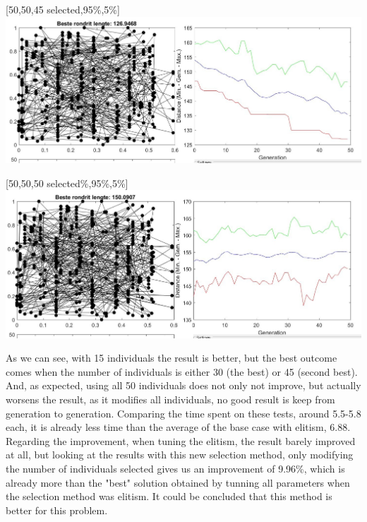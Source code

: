 \begin{center}
[50,50,45 selected,95\%,5\%]\\
\includegraphics[width=15cm]{img/optional/optional_4.jpg}
\end{center}

\begin{center}
[50,50,50 selected\%,95\%,5\%]\\
\includegraphics[width=15cm]{img/optional/optional_5.jpg}
\end{center}

As we can see, with 15 individuals the result is better, but the best outcome
comes when the number of individuals is either 30 (the best) or 45 (second
best). And, as expected, using all 50 individuals does not only not improve,
but actually worsens the result, as it modifies all individuals, no good
result is keep from generation to generation. Comparing the time spent on these
tests, around 5.5-5.8 each, it is already less time than the average of the base
case with elitism, 6.88. 
Regarding the improvement, when tuning the elitism, the result barely improved
at all, but looking at the results with this new selection method, only
modifying the number of individuals selected gives us an improvement of 9.96\%,
which is already more than the "best" solution obtained by tunning all
parameters when the selection method was elitism. It could be concluded
that this method is better for this problem.\\ 


